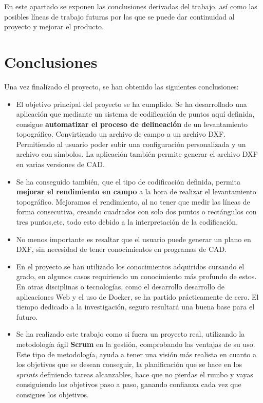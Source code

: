 
En este apartado se exponen las conclusiones derivadas del trabajo, así como
las posibles líneas de trabajo futuras por las que se puede dar continuidad al
proyecto y mejorar el producto.

\section{Conclusiones}

Una vez finalizado el proyecto, se han obtenido las siguientes conclusiones:

\begin{itemize}
\item El objetivo principal del proyecto se ha cumplido. Se ha desarrollado una aplicación que mediante un sistema de codificación de puntos aquí definida, consigue \textbf{automatizar el proceso de delineación} de un levantamiento topográfico. Convirtiendo un archivo de campo a un archivo DXF. Permitiendo al usuario poder subir una configuración personalizada y un archivo con símbolos. La aplicación también permite generar el archivo DXF en varias versiones de CAD. 

\item Se ha conseguido también, que el tipo de codificación definida, permita \textbf{mejorar el rendimiento en campo} a la hora de realizar el levantamiento topográfico. Mejoramos el rendimiento, al no tener que medir las líneas de forma consecutiva, creando cuadrados con solo dos puntos o rectángulos con tres puntos,etc, todo esto debido a la interpretación de la codificación.

\item No menos importante es resaltar que el usuario puede generar un plano en DXF, sin necesidad de tener conocimientos en programas de CAD.

\item En el proyecto se han utilizado los conocimientos adquiridos cursando el grado, en algunos casos requiriendo un conocimiento más profundo de estos. En otras disciplinas o tecnologías, como el desarrollo desarrollo de aplicaciones Web y el uso de Docker, se ha partido prácticamente de cero.
El tiempo dedicado a la investigación, seguro resultará una buena base para el futuro.

\item Se ha realizado este trabajo como si fuera un proyecto real,
utilizando la  metodología ágil \textbf{Scrum} en la gestión, comprobando las ventajas de su uso. Este tipo de metodología, ayuda a tener una visión más realista en cuanto a los objetivos que se desean conseguir, la planificación que se hace en los \emph{sprints} definiendo tareas alcanzables, hace que no pierdas el rumbo y vayas consiguiendo los objetivos paso a paso, ganando confianza cada vez que consigues los objetivos. 
\end{itemize}

